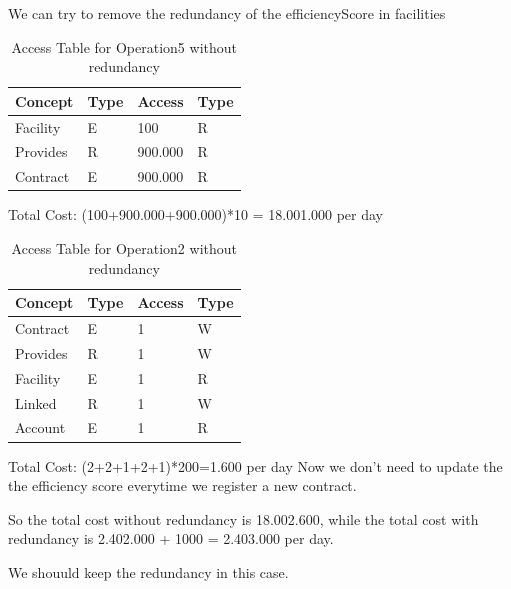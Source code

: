 \noindent We can try to remove the redundancy of the efficiencyScore in facilities
\begin{table}[H]
\renewcommand{\arraystretch}{1.3} %
\begin{tabularx}{\textwidth}{|X|X|X|X|}
\hline
\textbf{Concept}& \textbf{Type}  & \textbf{Access}    & \textbf{Type}     \\ \hline
Facility & E & 100 & R \\ \hline
Provides & R & 900.000 & R \\ \hline
Contract & E & 900.000 & R \\ \hline
\end{tabularx}
\caption{Access Table for Operation5 without redundancy}
\end{table}
\noindent Total Cost: (100+900.000+900.000)*10 = 18.001.000 per day 
\begin{table}[H]
    \renewcommand{\arraystretch}{1.3} %
    \begin{tabularx}{\textwidth}{|X|X|X|X|}
    \hline
    \textbf{Concept}& \textbf{Type}  & \textbf{Access}    & \textbf{Type}     \\ \hline
    Contract & E & 1 & W \\ \hline
    Provides & R & 1 & W \\ \hline
    Facility & E & 1 & R \\ \hline
    Linked & R & 1 & W \\ \hline
    Account & E & 1 & R \\ \hline
    \end{tabularx}
    \caption{Access Table for Operation2 without redundancy}
\end{table}
\noindent Total Cost: (2+2+1+2+1)*200=1.600 per day
\newline
\noindent Now we don't need to update the the efficiency score everytime we register a new contract.

\noindent So the total cost without redundancy is 18.002.600, while the total cost with redundancy is 2.402.000 + 1000 = 2.403.000 per day.

\noindent We shouuld keep the redundancy in this case.

